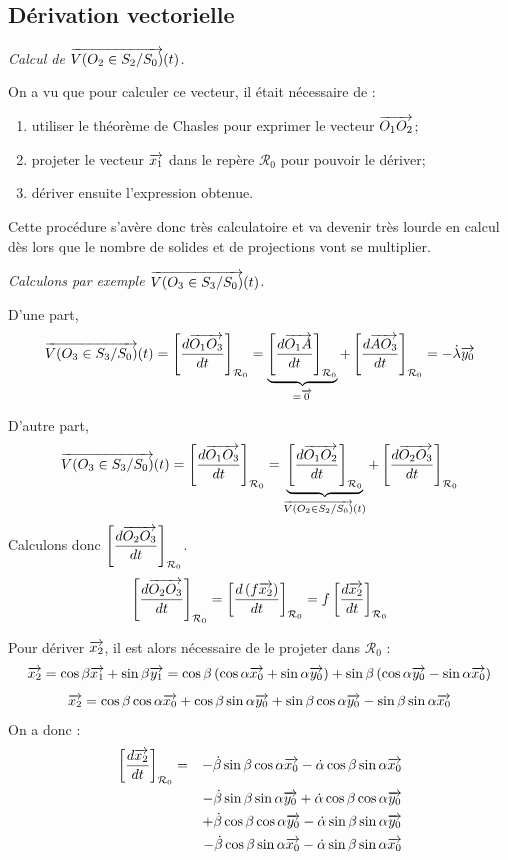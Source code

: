 \documentclass[11pt,oneside]{article}
\begin{document}
\subsection{Dérivation vectorielle}
\begin{exemple}
\textit{Calcul de $\overrightarrow{V(O_2\in S_2/S_0)}(t)$.}

On a vu que pour calculer ce vecteur, il était nécessaire de :
\begin{enumerate}
\item utiliser le théorème de Chasles pour exprimer le vecteur $\overrightarrow{O_1 O_2}$;
\item projeter le vecteur $\overrightarrow{x_1}$ dans le repère $\mathcal{R}_0$ pour pouvoir le dériver; 
\item dériver ensuite l'expression obtenue.
\end{enumerate}

Cette procédure s'avère donc très calculatoire et va devenir très lourde en calcul dès lors que le nombre de solides et de projections vont se multiplier.

\textit{Calculons par exemple $\overrightarrow{V(O_3\in S_3/S_0)}(t)$.}

D'une part, 
$$\overrightarrow{V(O_3\in S_3/S_0)}(t) 
= \left[\dfrac{d\overrightarrow{O_1O_3}}{dt}\right]_{\mathcal{R}_0}
= \underbrace{\left[\dfrac{d\overrightarrow{O_1A}}{dt}\right]_{\mathcal{R}_0}}_{=\overrightarrow{0}}
+ \left[\dfrac{d\overrightarrow{AO_3}}{dt}\right]_{\mathcal{R}_0}=
-\dot{\lambda} \overrightarrow{y_0}
$$

D'autre part, 
$$
\overrightarrow{V(O_3\in S_3/S_0)}(t) 
= \left[\dfrac{d\overrightarrow{O_1O_3}}{dt}\right]_{\mathcal{R}_0}
= \underbrace{\left[\dfrac{d\overrightarrow{O_1O_2}}{dt}\right]_{\mathcal{R}_0}}_{\overrightarrow{V(O_2\in S_2/S_0)}(t) }
+ \left[\dfrac{d\overrightarrow{O_2O_3}}{dt}\right]_{\mathcal{R}_0}
$$
Calculons donc $\left[\dfrac{d\overrightarrow{O_2O_3}}{dt}\right]_{\mathcal{R}_0}$.
$$
\left[\dfrac{d\overrightarrow{O_2O_3}}{dt}\right]_{\mathcal{R}_0}
= \left[\dfrac{d \left( f \overrightarrow{x_2} \right)}{dt}\right]_{\mathcal{R}_0}
= f\left[\dfrac{d \overrightarrow{x_2}}{dt}\right]_{\mathcal{R}_0}
$$

Pour dériver $\overrightarrow{x_2}$, il est alors nécessaire de le projeter dans $\mathcal{R}_0$ : 
$$
\overrightarrow{x_2}
=\cos\beta\overrightarrow{x_1}+\sin\beta\overrightarrow{y_1}
=\cos\beta\left( \cos\alpha\overrightarrow{x_0}+\sin\alpha\overrightarrow{y_0}\right)
+\sin\beta\left( \cos\alpha\overrightarrow{y_0}-\sin\alpha\overrightarrow{x_0}\right)
$$
$$
\overrightarrow{x_2}
=
\cos\beta\cos\alpha\overrightarrow{x_0}
+\cos\beta\sin\alpha\overrightarrow{y_0}
+\sin\beta\cos\alpha\overrightarrow{y_0}
-\sin\beta\sin\alpha\overrightarrow{x_0}
$$
On a donc :
\begin{eqnarray*}
\left[\dfrac{d \overrightarrow{x_2} }{dt}\right]_{\mathcal{R}_0}
&=&-\dot{\beta}\sin\beta\cos\alpha\overrightarrow{x_0}
-\dot{\alpha}\cos\beta\sin\alpha\overrightarrow{x_0}\\
&&-\dot{\beta}\sin\beta\sin\alpha\overrightarrow{y_0}
+\dot{\alpha}\cos\beta\cos\alpha\overrightarrow{y_0}\\
&&+\dot{\beta}\cos\beta\cos\alpha\overrightarrow{y_0}
-\dot{\alpha}\sin\beta\sin\alpha\overrightarrow{y_0}\\
&&-\dot{\beta}\cos\beta\sin\alpha\overrightarrow{x_0}
-\dot{\alpha}\sin\beta\sin\alpha\overrightarrow{x_0}
\end{eqnarray*}


\end{exemple}
\end{document}
